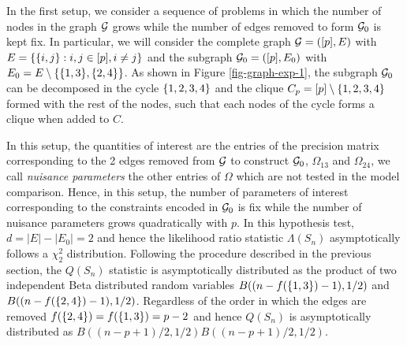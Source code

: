 In the first setup, we consider a sequence of problems in which the number of nodes in the graph ${\mathcal{G}}$ grows while the number of edges removed to form ${\mathcal{G}}_0$ is kept fix. In particular, we will consider the complete graph ${\mathcal{G}} = ([p], E)$ with $E = {\left\{{\left\{i, j\right\}} : i, j \in [p], i \neq j\right\}}$ and the subgraph ${\mathcal{G}}_0 = ([p], E_0)$ with $E_0 = E \setminus {\left\{{\left\{1, 3\right\}}, {\left\{2, 4\right\}}\right\}}$. As shown in Figure \ref{fig-graph-exp-1}, the subgraph ${\mathcal{G}}_0$ can be decomposed in the cycle ${\left\{1, 2, 3, 4\right\}}$ and the clique $C_p = [p] \setminus {\left\{1,2,3,4\right\}}$ formed with the rest of the nodes, such that each nodes of the cycle forms a clique when added to $C$. 

In this setup, the quantities of interest are the entries of the precision matrix corresponding to the 2 edges removed from ${\mathcal{G}}$ to construct ${\mathcal{G}}_0$, $\Omega_{13}$ and $\Omega_{24}$, we call \textit{nuisance parameters} the other entries of $\Omega$ which are not tested in the model comparison. Hence, in this setup, the number of parameters of interest corresponding to the constraints encoded in ${\mathcal{G}}_0$ is fix while the number of nuisance parameters grows quadratically with $p$.  In this hypothesis test, $d = |E| - |E_0| = 2$ and hence the likelihood ratio statistic $\Lambda(S_n)$ asymptotically follows a $\chi^2_2$ distribution. Following the procedure described in the previous section, the $Q(S_n)$ statistic is asymptotically distributed as the product of two independent Beta distributed random variables $B((n - f({\left\{1,3\right\}}) - 1), 1/2)$ and $B((n - f({\left\{2,4\right\}}) - 1), 1/2)$. Regardless of the order in which the edges are removed $f({\left\{2,4\right\}}) = f({\left\{1, 3\right\}}) = p - 2$ and hence $Q(S_n)$ is asymptotically distributed as $B((n-p+1)/2, 1/2)B((n-p+1)/2, 1/2)$.



